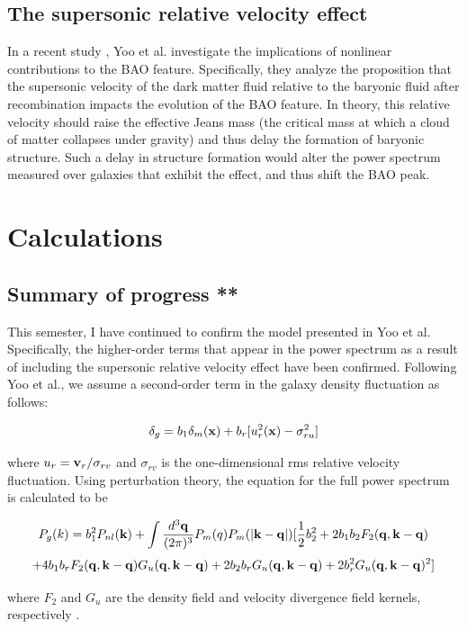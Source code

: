 \documentclass[12pt]{article}
\begin{document}
\subsection{The supersonic relative velocity effect}

In a recent study \cite{Yooetal}, Yoo et al. investigate the implications of nonlinear contributions to the BAO feature. Specifically, they analyze the proposition that the supersonic velocity of the dark matter fluid relative to the baryonic fluid after recombination impacts the evolution of the BAO feature. In theory, this relative velocity should raise the effective Jeans mass (the critical mass at which a cloud of matter collapses under gravity) and thus delay the formation of baryonic structure. Such a delay in structure formation would alter the power spectrum measured over galaxies that exhibit the effect, and thus shift the BAO peak.

\section{Calculations}
\subsection{Summary of progress **}

This semester, I have continued to confirm the model presented in Yoo et al. Specifically, the higher-order terms that appear in the power spectrum as a result of including the supersonic relative velocity effect have been confirmed. Following Yoo et al., we assume a second-order term in the galaxy density fluctuation as follows:

$$\delta_{g}=b_{1}\delta_{m}({\bf x})+b_{r}[u_{r}^{2}({\bf x})-\sigma_{ru}^{2}]$$

where $u_{r} ={\bf v}_{r}/\sigma_{rv}$ and $\sigma_{rv}$ is the one-dimensional rms relative velocity fluctuation. Using perturbation theory, the equation for the full power spectrum is calculated to be 

$$P_{g}(k) = b_{1}^{2}P_{nl}({\bf k}) + \int\frac{d^{3}\bf q}{(2\pi)^{3}}P_{m}(q)P_{m}(|{\bf k - q}|)[\frac{1}{2}b_{2}^{2}+2b_{1}b_{2}F_{2}({\bf q, k- q})$$
$$+4b_{1}b_{r}F_{2}({\bf q, k- q})G_{u}({\bf q, k- q})+2b_{2}b_{r}G_{u}({\bf q, k- q})+2b_{r}^{2}G_{u}({\bf q, k- q})^{2}]$$

where $F_{2}$ and $G_{u}$ are the density field and velocity divergence field kernels, respectively \cite{Yooetal} \cite{Bernardeau}.
\end{document}
